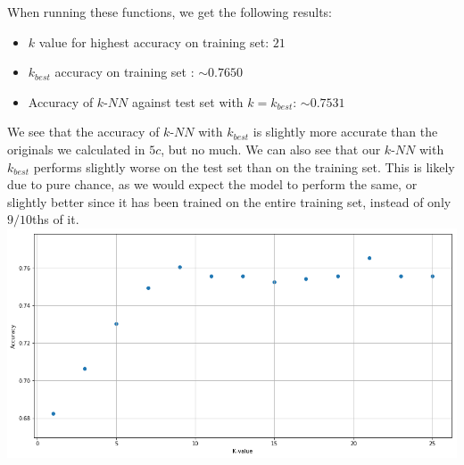 When running these functions, we get the following results:
\begin{itemize}
	\item $k$ value for highest accuracy on training set: $21$
	\item $k_{best}$ accuracy on training set : $\sim 0.7650$
	\item Accuracy of $k$-$NN$ against test set with $k=k_{best}$: $\sim 0.7531$
\end{itemize}
We see that the accuracy of $k$-$NN$ with $k_{best}$ is slightly more accurate than the originals we calculated in $5c$, but no much. We can also see that our $k$-$NN$ with $k_{best}$ performs slightly worse on the test set than on the training set. This is likely due to pure chance, as we would expect the model to perform the same, or slightly better since it has been trained on the entire training set, instead of only $9/10$ths of it.\\
\includegraphics[width=\linewidth]{5d1.png}